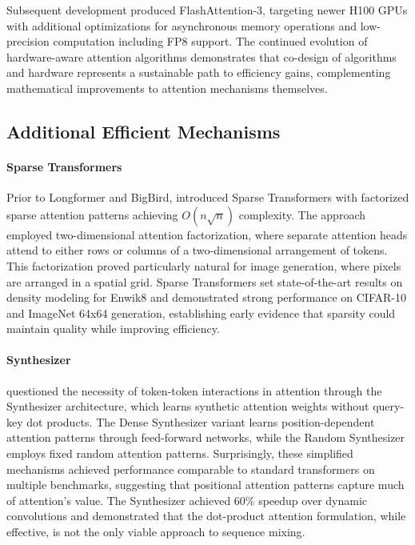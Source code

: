 \documentclass[11pt,letterpaper]{article}
\begin{document}
Subsequent development produced FlashAttention-3, targeting newer H100 GPUs with additional optimizations for asynchronous memory operations and low-precision computation including FP8 support. The continued evolution of hardware-aware attention algorithms demonstrates that co-design of algorithms and hardware represents a sustainable path to efficiency gains, complementing mathematical improvements to attention mechanisms themselves.

\subsection{Additional Efficient Mechanisms}

\paragraph{Sparse Transformers}

Prior to Longformer and BigBird, \cite{child2019generating} introduced Sparse Transformers with factorized sparse attention patterns achieving $O(n\sqrt{n})$ complexity. The approach employed two-dimensional attention factorization, where separate attention heads attend to either rows or columns of a two-dimensional arrangement of tokens. This factorization proved particularly natural for image generation, where pixels are arranged in a spatial grid. Sparse Transformers set state-of-the-art results on density modeling for Enwik8 and demonstrated strong performance on CIFAR-10 and ImageNet 64x64 generation, establishing early evidence that sparsity could maintain quality while improving efficiency.

\paragraph{Synthesizer}

\cite{tay2020synthesizer} questioned the necessity of token-token interactions in attention through the Synthesizer architecture, which learns synthetic attention weights without query-key dot products. The Dense Synthesizer variant learns position-dependent attention patterns through feed-forward networks, while the Random Synthesizer employs fixed random attention patterns. Surprisingly, these simplified mechanisms achieved performance comparable to standard transformers on multiple benchmarks, suggesting that positional attention patterns capture much of attention's value. The Synthesizer achieved 60\% speedup over dynamic convolutions and demonstrated that the dot-product attention formulation, while effective, is not the only viable approach to sequence mixing.
\end{document}
